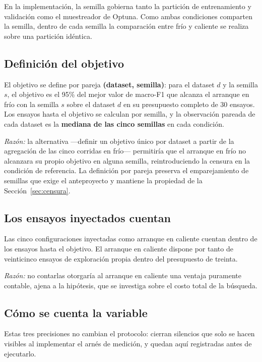 \documentclass[11pt,letterpaper]{article}
\begin{document}
En la implementación, la semilla gobierna tanto la partición de entrenamiento y
validación como el muestreador de Optuna. Como ambas condiciones comparten la
semilla, dentro de cada semilla la comparación entre frío y caliente se realiza
sobre una partición idéntica.

\subsection{Definición del objetivo}

El objetivo se define por pareja \textbf{(dataset, semilla)}: para el dataset $d$
y la semilla $s$, el objetivo es el 95\% del mejor valor de macro-F1 que
alcanza el arranque en frío con la semilla $s$ sobre el dataset $d$ en su
presupuesto completo de 30 ensayos. Los ensayos hasta el objetivo se calculan por
semilla, y la observación pareada de cada dataset es la \textbf{mediana de las
cinco semillas} en cada condición.

\textit{Razón:} la alternativa —definir un objetivo único por dataset a partir de
la agregación de las cinco corridas en frío— permitiría que el arranque en frío no
alcanzara su propio objetivo en alguna semilla, reintroduciendo la censura en la
condición de referencia. La definición por pareja preserva el emparejamiento de
semillas que exige el anteproyecto y mantiene la propiedad de la
Sección~\ref{sec:censura}.

\subsection{Los ensayos inyectados cuentan}

Las cinco configuraciones inyectadas como arranque en caliente cuentan dentro de
los ensayos hasta el objetivo. El arranque en caliente dispone por tanto de
veinticinco ensayos de exploración propia dentro del presupuesto de treinta.

\textit{Razón:} no contarlas otorgaría al arranque en caliente una ventaja
puramente contable, ajena a la hipótesis, que se investiga sobre el costo total
de la búsqueda.

\subsection{Cómo se cuenta la variable}
\label{sec:conteo}

Estas tres precisiones no cambian el protocolo: cierran silencios que solo se
hacen visibles al implementar el arnés de medición, y quedan aquí registradas
antes de ejecutarlo.
\end{document}
